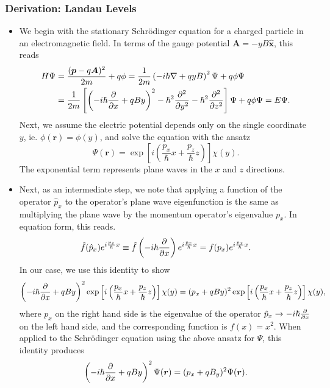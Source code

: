 \documentclass[11pt, a4paper]{article}
\renewcommand{\grad}{\nabla}
\newcommand{\Schro}{Schr\"{o}dinger\xspace}
\renewcommand{\vec}[1]{\bm{#1}}  %
\newcommand{\uvec}[1]{\hat{\vec{#1}}}  %
\renewcommand{\r}{\vec{r}}  %
\newcommand{\A}{\vec{A}}  %
\renewcommand{\P}{\Psi}  %
\begin{document}
\subsubsection{Derivation: Landau Levels}
\begin{itemize}
	
	\item We begin with the stationary \Schro equation for a charged particle in an electromagnetic field. In terms of the gauge potential $ \A = - y B \uvec{x} $, this reads
	\begin{align*}
		H\P &= \frac{(\vec{p} - q\A)^{2}}{2m} + q \phi = \frac{1}{2m} \left(-i\hbar \grad + qyB \right)^{2}\P + q \phi \P \\
		&  =\frac{1}{2m}\left[\left(-i\hbar \pdv{x} + qBy\right)^{2} - \hbar^{2}\pdv[2]{}{y} - \hbar^{2}\pdv[2]{}{z}\right]\P + q\phi \P = E \P.
	\end{align*}
	Next, we assume the electric potential depends only on the single coordinate $ y $, ie. $ \phi(\r) = \phi(y) $, and solve the equation with the ansatz
	\begin{equation*}
		\P(\r) = \exp\left[i \left(\frac{p_{x}}{\hbar}x + \frac{p_{z}}{\hbar}z \right)\right]\chi(y).
	\end{equation*}
	The exponential term represents plane waves in the $ x $ and $ z $ directions.
	
	\item Next, as an intermediate step, we note that applying a function of the operator $ \hat{p}_{x} $ to the operator's plane wave eigenfunction is the same as multiplying the plane wave by the momentum operator's eigenvalue $ p_{x} $. In equation form, this reads. 
	\begin{equation*}
		\hat{f}(\hat{p}_{x})e^{i\frac{p_{x}}{\hbar}x} \equiv  \hat{f}\left(-i\hbar \pdv{x}\right)e^{i\frac{p_{x}}{\hbar}x} = f(p_{x}) e^{i\frac{p_{x}}{\hbar}x}.
	\end{equation*}
	In our case, we use this identity to show
	\begin{align*}
		\left(-i\hbar \pdv{x} + qBy\right)^{2}\exp\left[i \left(\frac{p_{x}}{\hbar}x + \frac{p_{z}}{\hbar}z \right)\right]\chi(y) = (p_{x} + qBy)^{2}\exp\left[i \left(\frac{p_{x}}{\hbar}x + \frac{p_{z}}{\hbar}z \right)\right]\chi(y),
	\end{align*}
	where $ p_{x} $ on the right hand side is the eigenvalue of the operator $ \hat{p}_{x} \to -i\hbar \pdv{x}$ on the left hand side, and the corresponding function is $ f(x) = x^{2} $. When applied to the \Schro equation using the above ansatz for $ \P $, this identity produces
   \begin{equation*}
       \left(-i\hbar \pdv{x} + qBy\right)^{2} \P(\r) = (p_{x} + qB_{y})^{2} \P(\r).
   \end{equation*}
   

\end{itemize}
\end{document}
